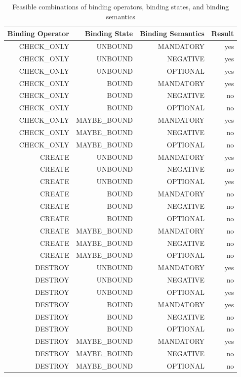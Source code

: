 \begin{table}[htbp]
  \centering
  \caption{Feasible combinations of binding operators, binding states, and binding semantics}
    \begin{tabular}{|r|r|r|r|}
    \hline
    \textbf{Binding Operator} & \textbf{Binding State} & \textbf{Binding Semantics} & \textbf{Result} \\
    \hline
    CHECK\_ONLY & UNBOUND & MANDATORY & yes \\
    CHECK\_ONLY & UNBOUND & NEGATIVE & yes \\
    CHECK\_ONLY & UNBOUND & OPTIONAL & yes \\
    CHECK\_ONLY & BOUND & MANDATORY & yes \\
    CHECK\_ONLY & BOUND & NEGATIVE & no \\
    CHECK\_ONLY & BOUND & OPTIONAL & no \\
    CHECK\_ONLY & MAYBE\_BOUND & MANDATORY & yes \\
    CHECK\_ONLY & MAYBE\_BOUND & NEGATIVE & no \\
    CHECK\_ONLY & MAYBE\_BOUND & OPTIONAL & no \\
    \hline
    CREATE & UNBOUND & MANDATORY & yes \\
    CREATE & UNBOUND & NEGATIVE & no \\
    CREATE & UNBOUND & OPTIONAL & yes \\
    CREATE & BOUND & MANDATORY & no \\
    CREATE & BOUND & NEGATIVE & no \\
    CREATE & BOUND & OPTIONAL & no \\
    CREATE & MAYBE\_BOUND & MANDATORY & no \\
    CREATE & MAYBE\_BOUND & NEGATIVE & no \\
    CREATE & MAYBE\_BOUND & OPTIONAL & no \\
    \hline
    DESTROY & UNBOUND & MANDATORY & yes \\
    DESTROY & UNBOUND & NEGATIVE & no \\
    DESTROY & UNBOUND & OPTIONAL & yes \\
    DESTROY & BOUND & MANDATORY & yes \\
    DESTROY & BOUND & NEGATIVE & no \\
    DESTROY & BOUND & OPTIONAL & no \\
    DESTROY & MAYBE\_BOUND & MANDATORY & yes \\
    DESTROY & MAYBE\_BOUND & NEGATIVE & no \\
    DESTROY & MAYBE\_BOUND & OPTIONAL & no \\
    \hline
    \end{tabular}%
  \label{tab:bindingCombinations}%
\end{table}%


